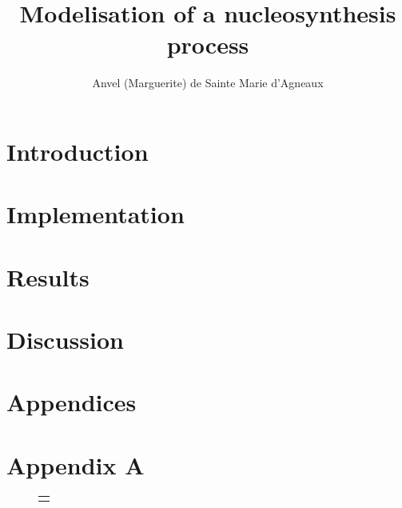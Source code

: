\documentclass[a4paper,12pt]{article}
\title{Modelisation of a nucleosynthesis process}
\author{Anvel (Marguerite) de Sainte Marie d'Agneaux}
\date{}
\begin{document}
\maketitle

\section{Introduction}
\label{sec:intro}

\section{Implementation}
\label{sec:imp}

\section{Results}
\label{sec:res}

\section{Discussion}
\label{sec:disc}

\printbibliography
\pagebreak
\section{Appendices}
\section{Appendix A}
\label{sec:AppA}

\begin{figure}[ht!]
\centering
\begin{tabular}{|c|c|}
\hline
\multicolumn{2}{|c|}{}\\
\end{tabular}
\end{figure}
\end{document}
